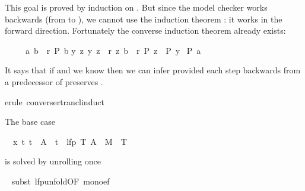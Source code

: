 \begin{isabellebody}
\begin{isamarkuptxt}
\begin{isabelle}
\end{isabelle}
This goal is proved by induction on . But since the model
checker works backwards (from  to ), we cannot use the
induction theorem : it works in the
forward direction. Fortunately the converse induction theorem
 already exists:
\begin{isabelle}%
\ \ \ \ \ {\isasymlbrakk}{\isacharparenleft}a{\isacharcomma}\ b{\isacharparenright}\ {\isasymin}\ r\isactrlsup {\isacharasterisk}{\isacharsemicolon}\ P\ b{\isacharsemicolon}\isanewline
\isaindent{\ \ \ \ \ \ }{\isasymAnd}y\ z{\isachardot}\ {\isasymlbrakk}{\isacharparenleft}y{\isacharcomma}\ z{\isacharparenright}\ {\isasymin}\ r{\isacharsemicolon}\ {\isacharparenleft}z{\isacharcomma}\ b{\isacharparenright}\ {\isasymin}\ r\isactrlsup {\isacharasterisk}{\isacharsemicolon}\ P\ z{\isasymrbrakk}\ {\isasymLongrightarrow}\ P\ y{\isasymrbrakk}\isanewline
\isaindent{\ \ \ \ \ }{\isasymLongrightarrow}\ P\ a%
\end{isabelle}
It says that if  and we know  then we can infer
 provided each step backwards from a predecessor  of
 preserves .%
\end{isamarkuptxt}%
\isamarkuptrue%
\isamarkupfalse%
{\isacharparenleft}erule\ converse{\isacharunderscore}rtrancl{\isacharunderscore}induct{\isacharparenright}%
\begin{isamarkuptxt}%
\noindent
The base case
\begin{isabelle}%
\ {}{\isachardot}\ {\isasymAnd}x\ t{\isachardot}\ t\ {\isasymin}\ A\ {\isasymLongrightarrow}\ t\ {\isasymin}\ lfp\ {\isacharparenleft}{\isasymlambda}T{\isachardot}\ A\ {\isasymunion}\ M{\isasyminverse}\ {\isacharbackquote}{\isacharbackquote}\ T{\isacharparenright}%
\end{isabelle}
is solved by unrolling  once%
\end{isamarkuptxt}%
\isamarkuptrue%
\ \isamarkupfalse%
{\isacharparenleft}subst\ lfp{\isacharunderscore}unfold{\isacharbrackleft}OF\ mono{\isacharunderscore}ef{\isacharbrackright}{\isacharparenright}%
\begin{isamarkuptxt}%
\begin{isabelle}%

\end{isabelle}
\end{isamarkuptxt}
\end{isabellebody}
